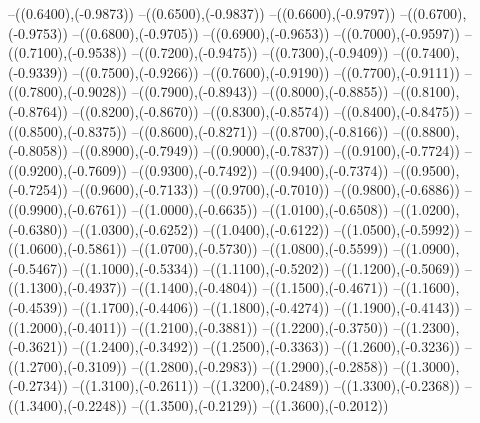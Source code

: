 {	--({\sx*(0.6400)},{\sy*(-0.9873)})
	--({\sx*(0.6500)},{\sy*(-0.9837)})
	--({\sx*(0.6600)},{\sy*(-0.9797)})
	--({\sx*(0.6700)},{\sy*(-0.9753)})
	--({\sx*(0.6800)},{\sy*(-0.9705)})
	--({\sx*(0.6900)},{\sy*(-0.9653)})
	--({\sx*(0.7000)},{\sy*(-0.9597)})
	--({\sx*(0.7100)},{\sy*(-0.9538)})
	--({\sx*(0.7200)},{\sy*(-0.9475)})
	--({\sx*(0.7300)},{\sy*(-0.9409)})
	--({\sx*(0.7400)},{\sy*(-0.9339)})
	--({\sx*(0.7500)},{\sy*(-0.9266)})
	--({\sx*(0.7600)},{\sy*(-0.9190)})
	--({\sx*(0.7700)},{\sy*(-0.9111)})
	--({\sx*(0.7800)},{\sy*(-0.9028)})
	--({\sx*(0.7900)},{\sy*(-0.8943)})
	--({\sx*(0.8000)},{\sy*(-0.8855)})
	--({\sx*(0.8100)},{\sy*(-0.8764)})
	--({\sx*(0.8200)},{\sy*(-0.8670)})
	--({\sx*(0.8300)},{\sy*(-0.8574)})
	--({\sx*(0.8400)},{\sy*(-0.8475)})
	--({\sx*(0.8500)},{\sy*(-0.8375)})
	--({\sx*(0.8600)},{\sy*(-0.8271)})
	--({\sx*(0.8700)},{\sy*(-0.8166)})
	--({\sx*(0.8800)},{\sy*(-0.8058)})
	--({\sx*(0.8900)},{\sy*(-0.7949)})
	--({\sx*(0.9000)},{\sy*(-0.7837)})
	--({\sx*(0.9100)},{\sy*(-0.7724)})
	--({\sx*(0.9200)},{\sy*(-0.7609)})
	--({\sx*(0.9300)},{\sy*(-0.7492)})
	--({\sx*(0.9400)},{\sy*(-0.7374)})
	--({\sx*(0.9500)},{\sy*(-0.7254)})
	--({\sx*(0.9600)},{\sy*(-0.7133)})
	--({\sx*(0.9700)},{\sy*(-0.7010)})
	--({\sx*(0.9800)},{\sy*(-0.6886)})
	--({\sx*(0.9900)},{\sy*(-0.6761)})
	--({\sx*(1.0000)},{\sy*(-0.6635)})
	--({\sx*(1.0100)},{\sy*(-0.6508)})
	--({\sx*(1.0200)},{\sy*(-0.6380)})
	--({\sx*(1.0300)},{\sy*(-0.6252)})
	--({\sx*(1.0400)},{\sy*(-0.6122)})
	--({\sx*(1.0500)},{\sy*(-0.5992)})
	--({\sx*(1.0600)},{\sy*(-0.5861)})
	--({\sx*(1.0700)},{\sy*(-0.5730)})
	--({\sx*(1.0800)},{\sy*(-0.5599)})
	--({\sx*(1.0900)},{\sy*(-0.5467)})
	--({\sx*(1.1000)},{\sy*(-0.5334)})
	--({\sx*(1.1100)},{\sy*(-0.5202)})
	--({\sx*(1.1200)},{\sy*(-0.5069)})
	--({\sx*(1.1300)},{\sy*(-0.4937)})
	--({\sx*(1.1400)},{\sy*(-0.4804)})
	--({\sx*(1.1500)},{\sy*(-0.4671)})
	--({\sx*(1.1600)},{\sy*(-0.4539)})
	--({\sx*(1.1700)},{\sy*(-0.4406)})
	--({\sx*(1.1800)},{\sy*(-0.4274)})
	--({\sx*(1.1900)},{\sy*(-0.4143)})
	--({\sx*(1.2000)},{\sy*(-0.4011)})
	--({\sx*(1.2100)},{\sy*(-0.3881)})
	--({\sx*(1.2200)},{\sy*(-0.3750)})
	--({\sx*(1.2300)},{\sy*(-0.3621)})
	--({\sx*(1.2400)},{\sy*(-0.3492)})
	--({\sx*(1.2500)},{\sy*(-0.3363)})
	--({\sx*(1.2600)},{\sy*(-0.3236)})
	--({\sx*(1.2700)},{\sy*(-0.3109)})
	--({\sx*(1.2800)},{\sy*(-0.2983)})
	--({\sx*(1.2900)},{\sy*(-0.2858)})
	--({\sx*(1.3000)},{\sy*(-0.2734)})
	--({\sx*(1.3100)},{\sy*(-0.2611)})
	--({\sx*(1.3200)},{\sy*(-0.2489)})
	--({\sx*(1.3300)},{\sy*(-0.2368)})
	--({\sx*(1.3400)},{\sy*(-0.2248)})
	--({\sx*(1.3500)},{\sy*(-0.2129)})
	--({\sx*(1.3600)},{\sy*(-0.2012)})
}
